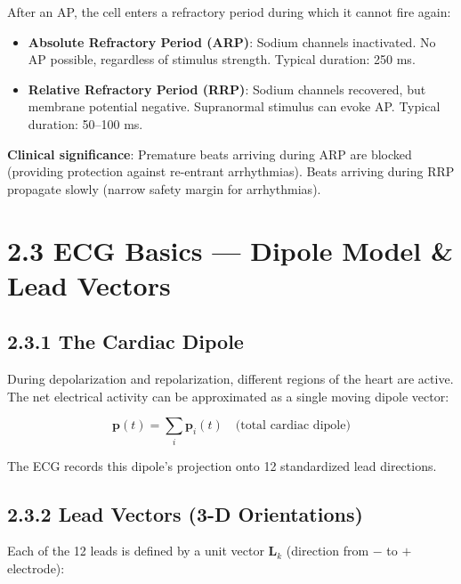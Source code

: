 \documentclass[12pt,oneside,a4paper]{book}
\begin{document}
After an AP, the cell enters a refractory period during which it cannot fire again:

\begin{itemize}
  \item \textbf{Absolute Refractory Period (ARP)}:
    Sodium channels inactivated. No AP possible, regardless of stimulus strength.
    Typical duration: 250 ms.

  \item \textbf{Relative Refractory Period (RRP)}:
    Sodium channels recovered, but membrane potential negative. Supranormal stimulus can evoke AP.
    Typical duration: 50--100 ms.
\end{itemize}

\textbf{Clinical significance}: Premature beats arriving during ARP are blocked (providing protection against re-entrant arrhythmias). Beats arriving during RRP propagate slowly (narrow safety margin for arrhythmias).

\section{2.3 ECG Basics — Dipole Model \& Lead Vectors}

\subsection{2.3.1 The Cardiac Dipole}

During depolarization and repolarization, different regions of the heart are active. The net electrical activity can be approximated as a single moving dipole vector:

$$\mathbf{p}(t) = \sum_i \mathbf{p}_i(t) \quad \text{(total cardiac dipole)}$$

The ECG records this dipole's projection onto 12 standardized lead directions.

\subsection{2.3.2 Lead Vectors (3-D Orientations)}

Each of the 12 leads is defined by a unit vector $\mathbf{L}_k$ (direction from $-$ to $+$ electrode):
\end{document}
